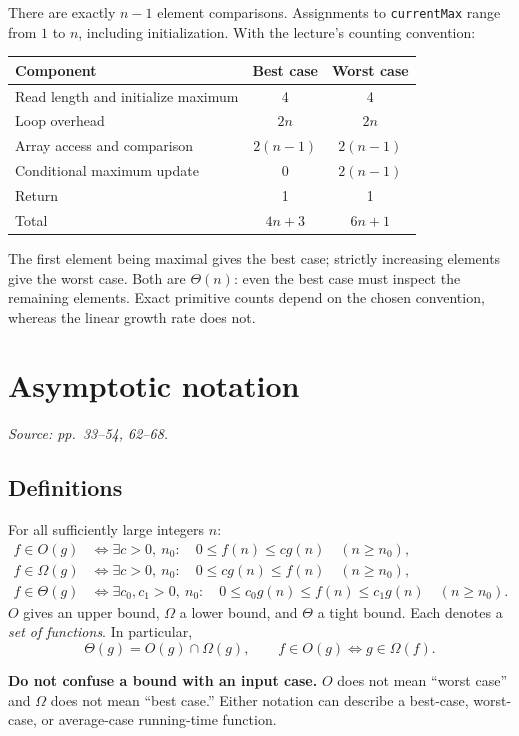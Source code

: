 \documentclass[11pt]{article}
\begin{document}
There are exactly $n-1$ element comparisons. Assignments to \texttt{currentMax} range from $1$ to $n$, including initialization. With the lecture's counting convention:
\begin{center}
\begin{tabular}{lcc}
\toprule
Component & Best case & Worst case\\
\midrule
Read length and initialize maximum & 4 & 4\\
Loop overhead & $2n$ & $2n$\\
Array access and comparison & $2(n-1)$ & $2(n-1)$\\
Conditional maximum update & 0 & $2(n-1)$\\
Return & 1 & 1\\
\midrule
Total & $4n+3$ & $6n+1$\\
\bottomrule
\end{tabular}
\end{center}
The first element being maximal gives the best case; strictly increasing elements give the worst case. Both are $\Theta(n)$: even the best case must inspect the remaining elements. Exact primitive counts depend on the chosen convention, whereas the linear growth rate does not.

\section{Asymptotic notation}
\textit{Source: pp.\ 33--54, 62--68.}

\subsection{Definitions}
For all sufficiently large integers $n$:
\begin{align*}
f\in O(g)&\iff \exists c>0,\ n_0:\quad 0\le f(n)\le c g(n)\quad(n\ge n_0),\\
f\in\Omega(g)&\iff \exists c>0,\ n_0:\quad 0\le c g(n)\le f(n)\quad(n\ge n_0),\\
f\in\Theta(g)&\iff \exists c_0,c_1>0,\ n_0:\quad
0\le c_0g(n)\le f(n)\le c_1g(n)\quad(n\ge n_0).
\end{align*}
$O$ gives an upper bound, $\Omega$ a lower bound, and $\Theta$ a tight bound. Each denotes a \emph{set of functions}. In particular,
\[
\Theta(g)=O(g)\cap\Omega(g),\qquad
f\in O(g)\iff g\in\Omega(f).
\]

\textbf{Do not confuse a bound with an input case.} $O$ does not mean ``worst case'' and $\Omega$ does not mean ``best case.'' Either notation can describe a best-case, worst-case, or average-case running-time function.
\end{document}
